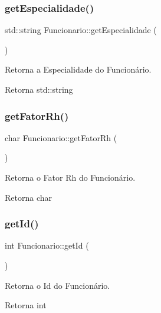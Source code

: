 \subsubsection{\texorpdfstring{get\+Especialidade()}{getEspecialidade()}}
{\footnotesize\ttfamily std\+::string Funcionario\+::get\+Especialidade (\begin{DoxyParamCaption}{ }\end{DoxyParamCaption})}



Retorna a Especialidade do Funcionário. 

\begin{DoxyReturn}{Retorna}
std\+::string 
\end{DoxyReturn}
\mbox{\label{classFuncionario_a87dc4304683c4a4492a5ecd516d29f44}} 
\subsubsection{\texorpdfstring{get\+Fator\+Rh()}{getFatorRh()}}
{\footnotesize\ttfamily char Funcionario\+::get\+Fator\+Rh (\begin{DoxyParamCaption}{ }\end{DoxyParamCaption})}



Retorna o Fator Rh do Funcionário. 

\begin{DoxyReturn}{Retorna}
char 
\end{DoxyReturn}
\mbox{\label{classFuncionario_a0288286a907e587b7ab75d6c23354a06}} 
\subsubsection{\texorpdfstring{get\+Id()}{getId()}}
{\footnotesize\ttfamily int Funcionario\+::get\+Id (\begin{DoxyParamCaption}{ }\end{DoxyParamCaption})}



Retorna o Id do Funcionário. 

\begin{DoxyReturn}{Retorna}
int 
\end{DoxyReturn}
\mbox{\label{classFuncionario_ac8b1947b4cb1c1216291c4750670fba2}} 
